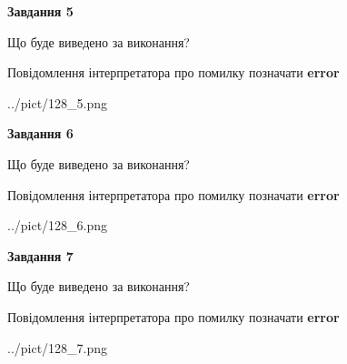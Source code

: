 \documentclass[10pt, ukrainian]{article}
\begin{document}
{\begin {large}
{\begin {center}\textbf{Завдання 5}\end {center}}\par
Що буде виведено за виконання? \par
Повідомлення інтерпретатора про помилку позначати \textbf{error}

\begin{center}
	{../pict/128_5.png}
\end{center}
\newpage

{\begin {center}\textbf{Завдання 6}\end {center}}\par
Що буде виведено за виконання? \par
Повідомлення інтерпретатора про помилку позначати \textbf{error}

\begin{center}
	{../pict/128_6.png}
\end{center}
\newpage

{\begin {center}\textbf{Завдання 7}\end {center}}\par
Що буде виведено за виконання? \par
Повідомлення інтерпретатора про помилку позначати \textbf{error}

\begin{center}
	{../pict/128_7.png}
\end{center}
\newpage

\end {large}}
\end{document}

